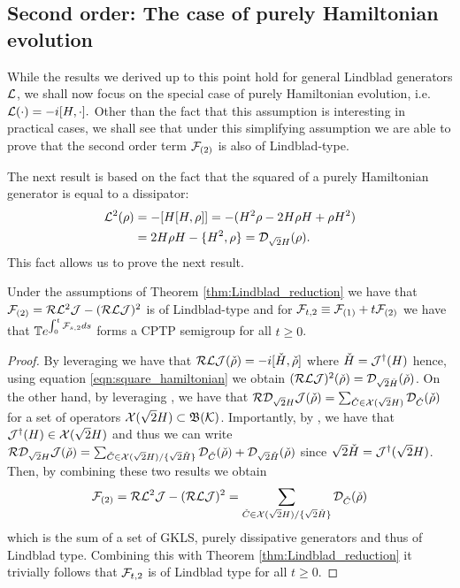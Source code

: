\documentclass[10pt,aps,pra,twocolumn,showpacs,superscriptaddress,nobalancelastpage,notitlepage,nofootinbib,longbibliography]{revtex4-2}
\begin{document}
\subsection{Second order: The case of purely Hamiltonian evolution}

While the results we derived up to this point hold for general Lindblad generators $\mathcal{L}$, we shall now focus on the special case of purely Hamiltonian evolution, i.e. $\mathcal{L}(\cdot) = -i[H,\cdot].$ Other than the fact that this assumption is interesting in practical cases, we shall see that under this simplifying assumption we are able to prove that the second order term $\mathcal{F}_{(2)}$ is also of Lindblad-type.

The next result is based on the fact that the squared of a purely Hamiltonian generator is equal to a dissipator:
\begin{align}
    \mathcal{L}^2(\rho) &= - [H[H,\rho]] = -(H^2\rho - 2H\rho H + \rho H^2)\nonumber \\
    &= 2H\rho H - \{H^2,\rho\} = \mathcal{D}_{\sqrt{2}H}(\rho).
    \label{eqn:square_hamiltonian}
\end{align}
This fact allows us to prove the next result.
\begin{theorem}
\label{thm:cptp_second_order}
    Under the assumptions of Theorem \ref{thm:Lindblad_reduction} we have that $\mathcal{F}_{(2)} = \mathcal{R}\mathcal{L}^2\mathcal{J} - (\mathcal{R} \mathcal{L} \mathcal{J})^2$ is of Lindblad-type and for $\mathcal{F}_{t,2} \equiv \mathcal{F}_{(1)} + t \mathcal{F}_{(2)}$ we have that $\mathbb{T} e^{\int_0^t \mathcal{F}_{s,2} ds}$ forms a CPTP semigroup for all $t\geq0$. 
\end{theorem}
\begin{proof}
    By leveraging \cite[Proposition 5]{grigoletto2024exact} we have that $\mathcal{R}\mathcal{L}\mathcal{J}(\check{\rho}) = -i[\check{H},\check{\rho}]$ where $\check{H} = \mathcal{J}^\dag(H)$ hence, using equation \eqref{eqn:square_hamiltonian} we obtain $(\mathcal{R}\mathcal{L}\mathcal{J})^2(\check{\rho}) = \mathcal{D}_{\sqrt{2}\check{H}}(\check{\rho})$. On the other hand, by leveraging \cite[Proposition 6 and Proposition 7]{grigoletto2025quantummodelreductioncontinuoustime}, we have that $\mathcal{R} \mathcal{D}_{\sqrt{2}H}\mathcal{J}(\check{\rho}) = \sum_{\check{C}\in\mathcal{X}(\sqrt{2}H)} \mathcal{D}_{\check{C}}(\check{\rho})$ for a set of operators $\mathcal{X}(\sqrt{2}H)\subset \mathfrak{B}(\mathcal{K})$. Importantly, by \cite[Corollary 4]{grigoletto2025quantummodelreductioncontinuoustime}, we have that $\mathcal{J}^\dag(H)\in\mathcal{X}(\sqrt{2}H)$ and thus we can write $\mathcal{R} \mathcal{D}_{\sqrt{2}H}\mathcal{J}(\check{\rho}) = \sum_{\check{C}\in\mathcal{X}(\sqrt{2}H)/\{\sqrt{2}\check{H}\}} \mathcal{D}_{\check{C}}(\check{\rho}) + \mathcal{D}_{\sqrt{2}\check{H}}(\check{\rho})$ since $\sqrt{2}\check{H} = \mathcal{J}^\dag(\sqrt{2}H)$. Then, by combining these two results we obtain 
    \[ \mathcal{F}_{(2)} = \mathcal{R}\mathcal{L}^2\mathcal{J} - (\mathcal{R} \mathcal{L} \mathcal{J})^2 = \sum_{\check{C}\in\mathcal{X}(\sqrt{2}H)/\{\sqrt{2}\check{H}\}} \mathcal{D}_{\check{C}}(\check{\rho}) \]
    which is the sum of a set of GKLS, purely dissipative generators and thus of Lindblad type. Combining this with Theorem \ref{thm:Lindblad_reduction} it trivially follows that $\mathcal{F}_{t,2}$ is of Lindblad type for all $t\geq0$.
\end{proof}
\end{document}
